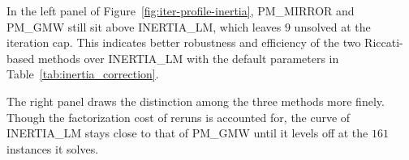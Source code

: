 \documentclass[class=scrbook, crop=false]{standalone}
\begin{document}
In the left panel of Figure~\ref{fig:iter-profile-inertia},
\textsf{PM\_MIRROR} and \textsf{PM\_GMW} still sit above \textsf{INERTIA\_LM},
which leaves $9$ unsolved at the iteration cap.
This indicates better robustness and efficiency of the two Riccati-based methods over
\textsf{INERTIA\_LM} with the default parameters in Table~\ref{tab:inertia_correction}.

The right panel draws the distinction among the three methods more finely.
Though the factorization cost of reruns is accounted for,
the curve of \textsf{INERTIA\_LM} stays close to that of \textsf{PM\_GMW}
until it levels off at the $161$ instances it solves.






\end{document}
